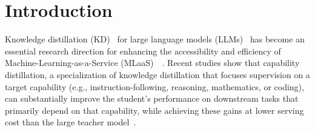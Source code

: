 \section{Introduction}
\label{sec:intro}

Knowledge distillation (KD)~\citep{hinton2015distilling} for large language models (LLMs)~\citep{zhao2023survey} has become an essential research direction for enhancing the accessibility and efficiency of Machine-Learning-as-a-Service (MLaaS)~\citep{cai2024llmaas,xu2024survey_kd_llms,yang2024survey_kdllm}~\citep{sanh2019distilbert,jiao2020tinybert,wang2020minilm,li2021dynamickd,liang2023less}. Recent studies show that capability distillation, a specialization of knowledge distillation that focuses supervision on a target capability (e.g., instruction-following, reasoning, mathematics, or coding), can substantially improve the student’s performance on downstream tasks that primarily depend on that capability, while achieving these gains at lower serving cost than the large teacher model~\citep{magister2023teaching,shridhar2022distilling,xu2023wizardlm,yue2024distilling}.


